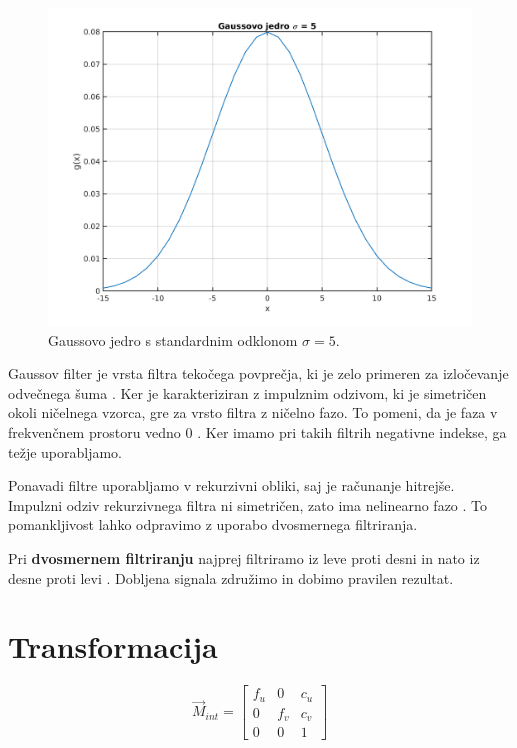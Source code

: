 {\begin{figure}
\centering
\includegraphics[width=0.7\columnwidth]{./Slike/gauss-kernel.png}
\caption{Gaussovo jedro s standardnim odklonom $\sigma=5$. }
\label{fig:gauss}
\end{figure}


Gaussov filter je vrsta filtra tekočega povprečja, ki je zelo primeren za izločevanje odvečnega šuma \cite{smith1997scientist}. Ker je karakteriziran z impulznim odzivom, ki je simetričen okoli ničelnega vzorca, gre za vrsto filtra z ničelno fazo. To pomeni, da je faza v frekvenčnem prostoru vedno $0$ \cite{smith1997scientist}. Ker imamo pri takih filtrih negativne indekse, ga težje uporabljamo. 

Ponavadi filtre uporabljamo v rekurzivni obliki, saj je računanje hitrejše. Impulzni odziv rekurzivnega filtra ni simetričen, zato ima nelinearno fazo \cite{smith1997scientist}. To pomankljivost lahko odpravimo z uporabo dvosmernega filtriranja.

Pri \textbf{dvosmernem filtriranju} najprej filtriramo iz leve proti desni in nato iz desne proti levi \cite{smith1997scientist}. Dobljena signala združimo in dobimo pravilen rezultat.







\section{Transformacija }
\begin{equation}
\vec{M}_{int} = \begin{bmatrix}
	f_u & 0 & c_u \\
    0 & f_v & c_v \\
    0 & 0 & 1
\end{bmatrix}
\label{eq:intrinsic}
\end{equation}

}
